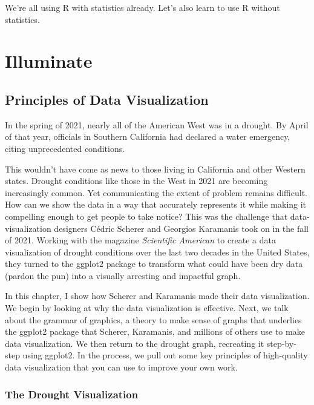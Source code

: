 \documentclass[
]{book}
\begin{document}
We're all using R with statistics already. Let's also learn to use R without statistics.

\hypertarget{part-illuminate}{%
\part*{Illuminate}\label{part-illuminate}}

\hypertarget{data-viz-chapter}{%
\chapter{Principles of Data Visualization}\label{data-viz-chapter}}

In the spring of 2021, nearly all of the American West was in a drought. By April of that year, officials in Southern California had declared a water emergency, citing unprecedented conditions.

This wouldn't have come as news to those living in California and other Western states. Drought conditions like those in the West in 2021 are becoming increasingly common. Yet communicating the extent of problem remains difficult. How can we show the data in a way that accurately represents it while making it compelling enough to get people to take notice?
This was the challenge that data-visualization designers Cédric Scherer and Georgios Karamanis took on in the fall of 2021. Working with the magazine \emph{Scientific American} to create a data visualization of drought conditions over the last two decades in the United States, they turned to the ggplot2 package to transform what could have been dry data (pardon the pun) into a visually arresting and impactful graph.

In this chapter, I show how Scherer and Karamanis made their data visualization. We begin by looking at why the data visualization is effective. Next, we talk about the grammar of graphics, a theory to make sense of graphs that underlies the ggplot2 package that Scherer, Karamanis, and millions of others use to make data visualization. We then return to the drought graph, recreating it step-by-step using ggplot2. In the process, we pull out some key principles of high-quality data visualization that you can use to improve your own work.

\hypertarget{the-drought-visualization}{%
\section*{The Drought Visualization}\label{the-drought-visualization}}
\end{document}
